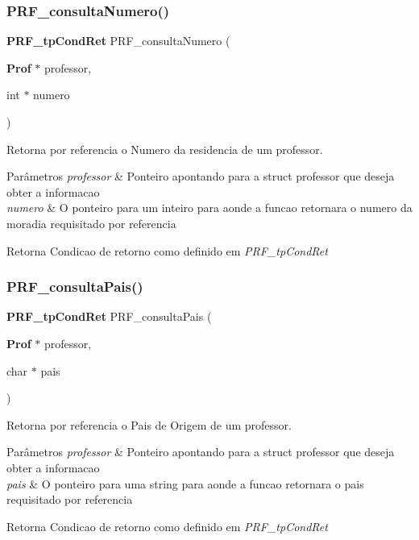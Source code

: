 \subsubsection{P\+R\+F\+\_\+consulta\+Numero()}
{\footnotesize\ttfamily \textbf{ P\+R\+F\+\_\+tp\+Cond\+Ret} P\+R\+F\+\_\+consulta\+Numero (\begin{DoxyParamCaption}\item[{\textbf{ Prof} $\ast$}]{professor,  }\item[{int $\ast$}]{numero }\end{DoxyParamCaption})}



Retorna por referencia o Numero da residencia de um professor. 


\begin{DoxyParams}{Parâmetros}
{\em professor} & Ponteiro apontando para a struct professor que deseja obter a informacao \\
\hline
{\em numero} & O ponteiro para um inteiro para aonde a funcao retornara o numero da moradia requisitado por referencia \\
\hline
\end{DoxyParams}
\begin{DoxyReturn}{Retorna}
Condicao de retorno como definido em {\itshape P\+R\+F\+\_\+tp\+Cond\+Ret} 
\end{DoxyReturn}
\mbox{\label{group__modulo_professor_ga330d3968561d75935ce224251cc656b8}} 
\subsubsection{P\+R\+F\+\_\+consulta\+Pais()}
{\footnotesize\ttfamily \textbf{ P\+R\+F\+\_\+tp\+Cond\+Ret} P\+R\+F\+\_\+consulta\+Pais (\begin{DoxyParamCaption}\item[{\textbf{ Prof} $\ast$}]{professor,  }\item[{char $\ast$}]{pais }\end{DoxyParamCaption})}



Retorna por referencia o Pais de Origem de um professor. 


\begin{DoxyParams}{Parâmetros}
{\em professor} & Ponteiro apontando para a struct professor que deseja obter a informacao \\
\hline
{\em pais} & O ponteiro para uma string para aonde a funcao retornara o pais requisitado por referencia \\
\hline
\end{DoxyParams}
\begin{DoxyReturn}{Retorna}
Condicao de retorno como definido em {\itshape P\+R\+F\+\_\+tp\+Cond\+Ret} 
\end{DoxyReturn}
\mbox{\label{group__modulo_professor_ga231f378246f5583fb7e16c0f54958af8}} 

